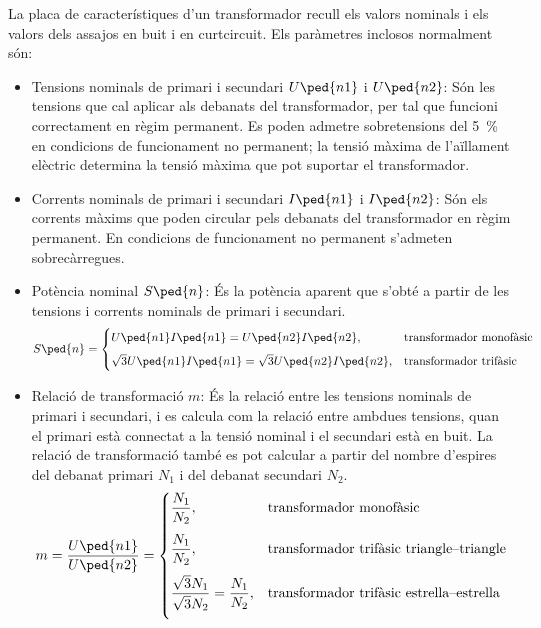 La  placa de característiques d'un transformador recull els valors nominals  i els valors dels assajos
en buit i en curtcircuit. Els paràmetres inclosos normalment són:
\begin{itemize}
   \item Tensions nominals de primari i secundari  $U\ped{n1}$ i $U\ped{n2}$: Són les tensions que cal aplicar als debanats del transformador, per tal que funcioni correctament en règim permanent. Es poden admetre sobretensions del \qty{5}{\percent} en condicions de funcionament no permanent; la tensió màxima de l'aïllament elèctric determina la tensió màxima que pot suportar el transformador.
   \item Corrents nominals de primari i secundari  $I\ped{n1}$ i $I\ped{n2}$: Són els corrents màxims que poden circular pels debanats del transformador en règim permanent. En condicions de funcionament no permanent s'admeten sobrecàrregues.
   \item Potència nominal $S\ped{n}$: És la potència aparent que s'obté a partir de les tensions i corrents nominals de primari i secundari.
       \begin{equation}
        S\ped{n} = \begin{cases} U\ped{n1} I\ped{n1} = U\ped{n2} I\ped{n2}, & \text{transformador monofàsic} \\[2mm]
        \sqrt{3} U\ped{n1} I\ped{n1} = \sqrt{3} U\ped{n2} I\ped{n2}, & \text{transformador trifàsic} \end{cases}
       \end{equation}
   \item Relació de transformació $m$: És la relació entre les tensions nominals de primari i secundari, i es calcula com la relació entre ambdues tensions, quan el primari està connectat a la tensió nominal i el secundari està en buit. La relació de  transformació també es pot calcular a partir del nombre d'espires del debanat primari $N_1$ i del debanat secundari $N_2$.
       \begin{equation}
        m = \frac{U\ped{n1}}{U\ped{n2}} =  \begin{cases}
        \dfrac{N_1}{N_2}, & \text{transformador monofàsic} \\[0.4cm]
        \dfrac{N_1}{N_2}, & \text{transformador trifàsic triangle--triangle} \\[0.4cm]
        \dfrac{\sqrt{3}N_1}{\sqrt{3}N_2} = \dfrac{N_1}{N_2}, & \text{transformador trifàsic estrella--estrella} \\[0.4cm]

\end{cases}
\end{equation}
\end{itemize}
